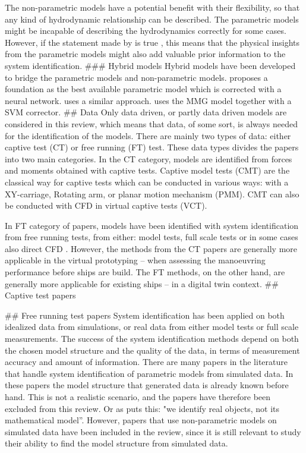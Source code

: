 The non-parametric models have a potential benefit with their flexibility, so that any kind of hydrodynamic relationship can be described. The parametric models might be incapable of describing the hydrodynamics correctly for some cases. However, if the statement made by \cite{revestidoherreroTwostepIdentificationNonlinear2012} is true , this means that the physical insights from the parametric models might also add valuable prior information to the system identification.
### Hybrid models
Hybrid models have been developed to bridge the parametric models and non-parametric models. \cite{wangIncorporatingApproximateDynamics2021} proposes a foundation as the best available parametric model which is corrected with a neural network. \cite{nielsenMachineLearningEnhancement2022} uses a similar approach. \cite{dongMathdataIntegratedPrediction2023a} uses the MMG model together with a SVM corrector.
## Data
Only data driven, or partly data driven models are considered in this review, which means that data, of some sort, is always needed for the identification of the models. There are mainly two types of data: either captive test (CT) or free running (FT) test. These data types divides the papers into two main categories. In the CT category, models are identified from forces and moments obtained with captive tests. Captive model tests (CMT) are the classical way for captive tests which can be conducted in various ways: with a XY-carriage, Rotating arm, or planar motion mechanism (PMM). CMT can also be conducted with CFD in virtual captive tests (VCT). 

In FT category of papers, models have been identified with system identification from free running tests, from either: model tests, full scale tests or in some cases also direct CFD \cite{arakiEstimatingManeuveringCoefficients2012}.  However, the methods from the CT papers are generally more applicable in the virtual prototyping – when assessing the manoeuvring performance before ships are build. The FT methods, on the other hand, are generally more applicable for existing ships – in a digital twin context.   
## Captive test papers

## Free running test papers
System identification has been applied on both idealized data from simulations, or real data from either model tests or full scale measurements. The success of the system identification methods depend on both the chosen model structure and the quality of the data, in terms of measurement accuracy and amount of information. 
There are many papers in the literature that handle system identification of parametric models from simulated data. 
In these papers the model structure that generated data is already known before hand. This is not a realistic scenario, and the papers have therefore been excluded from this review. Or as \cite{millerShipModelIdentification2021} puts this: "we identify real objects, not its mathematical model”. However, papers that use non-parametric models on simulated data have been included in the review, since it is still relevant to study their ability to find the model structure from simulated data.

